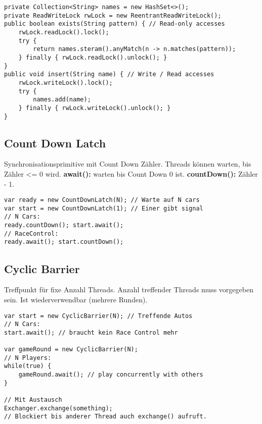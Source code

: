 \begin{lstlisting}
private Collection<String> names = new HashSet<>();
private ReadWriteLock rwLock = new ReentrantReadWriteLock();
public boolean exists(String pattern) { // Read-only accesses
    rwLock.readLock().lock();
    try {
        return names.steram().anyMatch(n -> n.matches(pattern));
    } finally { rwLock.readLock().unlock(); }
}
public void insert(String name) { // Write / Read accesses
    rwLock.writeLock().lock();
    try {
        names.add(name);
    } finally { rwLock.writeLock().unlock(); }
}
\end{lstlisting}

\subsection{Count Down Latch}
Synchronisationsprimitive mit Count Down Zähler.
Threads können warten, bis Zähler <= 0 wird.
\textbf{await():} warten bis Count Down 0 ist.
\textbf{countDown():} Zähler - 1.

\begin{lstlisting}
var ready = new CountDownLatch(N); // Warte auf N cars
var start = new CountDownLatch(1); // Einer gibt signal
// N Cars:
ready.countDown(); start.await();
// RaceControl:
ready.await(); start.countDown();
\end{lstlisting}

\subsection{Cyclic Barrier}
Treffpunkt für fixe Anzahl Threads. Anzahl treffender Threads muss vorgegeben sein.
Ist wiederverwendbar (mehrere Runden).

\begin{lstlisting}
var start = new CyclicBarrier(N); // Treffende Autos
// N Cars:
start.await(); // braucht kein Race Control mehr

var gameRound = new CyclicBarrier(N);
// N Players:
while(true) {
    gameRound.await(); // play concurrently with others
}

// Mit Austausch
Exchanger.exchange(something);
// Blockiert bis anderer Thread auch exchange() aufruft.
\end{lstlisting}